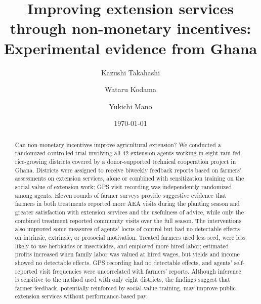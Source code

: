 \documentclass[11pt]{article}
\title{Improving extension services through non-monetary incentives: Experimental evidence from Ghana}
\author{Kazushi Takahashi \and Wataru Kodama \and Yukichi Mano}
\date{\today}
\begin{document}
\maketitle

\begin{abstract}
\noindent
Can non-monetary incentives improve agricultural extension? We conducted a randomized controlled trial involving all 42 extension agents working in eight rain-fed rice-growing districts covered by a donor-supported technical cooperation project in Ghana. Districts were assigned to receive biweekly feedback reports based on farmers’ assessments on extension services, alone or combined with sensitization training on the social value of extension work; GPS visit recording was independently randomized among agents. Eleven rounds of farmer surveys provide suggestive evidence that farmers in both treatments reported more AEA visits during the planting season and greater satisfaction with extension services and the usefulness of advice, while only the combined treatment reported community visits over the full season. The interventions also improved some measures of agents' locus of control but had no detectable effects on intrinsic, extrinsic, or prosocial motivation. Treated farmers used less seed, were less likely to use herbicides or insecticides, and employed more hired labor; estimated profits increased when family labor was valued at hired wages, but yields and income showed no detectable effects. GPS recording had no detectable effects, and agents' self-reported visit frequencies were uncorrelated with farmers' reports. Although inference is sensitive to the method used with only eight districts, the findings suggest that farmer feedback, potentially reinforced by social-value training, may improve public extension services without performance-based pay. 


\end{abstract}
\end{document}
